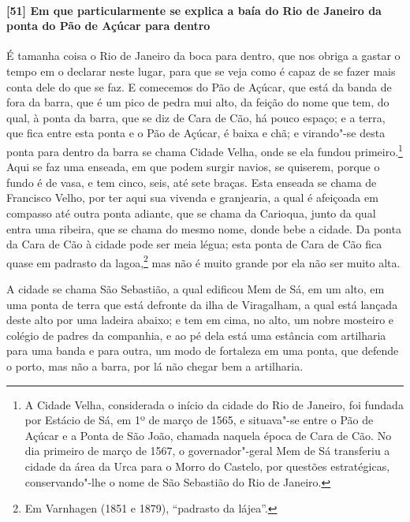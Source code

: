 \begin{linenumbers}
\paragraph{[51] Em que particularmente se explica a baía do Rio de Janeiro da ponta do Pão
de Açúcar para dentro} \quad
É tamanha coisa o Rio de Janeiro da boca para dentro, que nos obriga a gastar o tempo em o
declarar neste lugar, para que se veja como é capaz de se fazer mais conta dele do que se
faz. E comecemos do Pão de Açúcar, que está da banda de fora da barra, que é um pico de
pedra mui alto, da feição do nome que tem, do qual, à ponta da barra, que se diz de Cara
de Cão, há pouco espaço; e a terra, que fica entre esta ponta e o Pão de Açúcar, é baixa e
chã; e virando"-se desta ponta para dentro da barra se chama Cidade Velha, onde se ela
fundou primeiro.\footnote{ A Cidade Velha, considerada o início da cidade do Rio de
Janeiro, foi fundada por Estácio de Sá, em 1º de março de 1565, e situava"-se entre o Pão
de Açúcar e a Ponta de São João, chamada naquela época de Cara de Cão. No dia primeiro de
março de 1567, o governador"-geral Mem de Sá transferiu a cidade da área da Urca para o
Morro do Castelo, por questões estratégicas, conservando"-lhe o nome de São Sebastião do
Rio de Janeiro.} Aqui se faz uma enseada, em que podem surgir navios, se quiserem, porque
o fundo é de vasa, e tem cinco, seis, até sete braças. Esta enseada se chama de Francisco
Velho, por ter aqui sua vivenda e granjearia, a qual é afeiçoada em compasso até outra
ponta adiante, que se chama da Carioqua, junto da qual entra uma ribeira, que se chama do
mesmo nome, donde bebe a cidade. Da ponta da Cara de Cão à cidade pode ser meia légua;
esta ponta de Cara de Cão fica quase em padrasto da lagoa,\footnote{ Em Varnhagen (1851 e
1879), ``padrasto da lájea''.} mas não é muito grande por ela não ser muito alta.

A cidade se chama São Sebastião, a qual edificou Mem de Sá, em um alto, em uma ponta de
terra que está defronte da ilha de Viragalham, a qual está lançada deste alto por uma
ladeira abaixo; e tem em cima, no alto, um nobre mosteiro e colégio de padres da
companhia, e ao pé dela está uma estância com artilharia para uma banda e para outra, um
modo de fortaleza em uma ponta, que defende o porto, mas não a barra, por lá não chegar
bem a artilharia.


\end{linenumbers}
